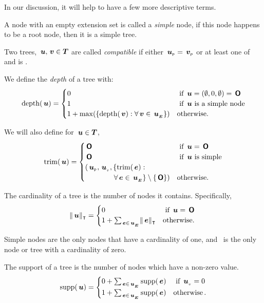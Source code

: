 In our discussion, it will help to have a few more descriptive terms.

A node with an empty extension set is called a \emph{simple}
node, if this node happens to be a root node, then it is a simple tree.

Two trees, $\,\boldsymbol{u}, \,\boldsymbol{v} \in \boldsymbol{T}$ are called
  \emph{compatible} if either ${\,\boldsymbol{u}}_{{}_{\mathsf{P}}} = {\,\boldsymbol{v}}_{{}_{\mathsf{P}}}$ or at least
  one of  and  is \tnulltree.

We define the \emph{depth} of a tree with:
  \begin{align*}
    \operatorname{depth}(\,\boldsymbol{u}) = \begin{cases}
      0 & \text{ if } \,\boldsymbol{u} = (\emptyset,0,\emptyset) = \,\boldsymbol{\mathsf{O}} \\
      1 & \text{ if } \,\boldsymbol{u} \text{ is a simple node} \\
      1 + \max(\lbrace\operatorname{depth}(\,\boldsymbol{v}):\forall \,\boldsymbol{v} \in {\,\boldsymbol{u}}_{{}_{\boldsymbol{E}}}\rbrace) & \text{otherwise.}
    \end{cases}
  \end{align*}

We will also define for \(\,\boldsymbol{u} \in \boldsymbol{T}\),
  \begin{align*}
    \operatorname{trim}(\,\boldsymbol{u}) = \begin{cases}
      \,\boldsymbol{\mathsf{O}} & \text{ if } \,\boldsymbol{u} = \,\boldsymbol{\mathsf{O}} \\
      \,\boldsymbol{\mathsf{O}} & \text{ if } \,\boldsymbol{u} \text{ is simple} \\
      ({\,\boldsymbol{u}}_{{}_{\mathsf{P}}}, {\,\boldsymbol{u}}_{{}_{v}}, \lbrace \operatorname{trim}(\,\boldsymbol{e}): \\
      \qquad\qquad\forall\,\boldsymbol{e}\in{\,\boldsymbol{u}}_{{}_{\boldsymbol{E}}} \rbrace \setminus \{\,\boldsymbol{\mathsf{O}}\}) & \text{otherwise.}
    \end{cases}
  \end{align*}

The cardinality of a tree is the number of nodes it
  contains. Specifically, 
  \begin{align*}
    \lVert{\,\boldsymbol{u}}\rVert_{\intercal} = \begin{cases}
      0 & \text{ if } \,\boldsymbol{u} = \,\boldsymbol{\mathsf{O}}\ \\
      1 + \sum_{\,\boldsymbol{e}\in{\,\boldsymbol{u}}_{{}_{\boldsymbol{E}}}} \lVert{\,\boldsymbol{e}}\rVert_{\intercal} & \text{otherwise.}
    \end{cases}
  \end{align*}

  Simple nodes are the only nodes that have a cardinality of one, and \tnulltree\ is the only node or tree with a
  cardinality of zero.

The support of a tree is the number of nodes which have a
  non-zero value.
  \begin{align*}
    \operatorname{supp}(\,\boldsymbol{u}) = \begin{cases}
      0 + \sum_{\,\boldsymbol{e}\in{\,\boldsymbol{u}}_{{}_{\boldsymbol{E}}}} \operatorname{supp}(\,\boldsymbol{e}) & \text{ if } {\,\boldsymbol{u}}_{{}_{v}} = 0 \\
      1 + \sum_{\,\boldsymbol{e}\in{\,\boldsymbol{u}}_{{}_{\boldsymbol{E}}}} \operatorname{supp}(\,\boldsymbol{e}) & \operatorname{\text{otherwise}}.
    \end{cases}
  \end{align*}

